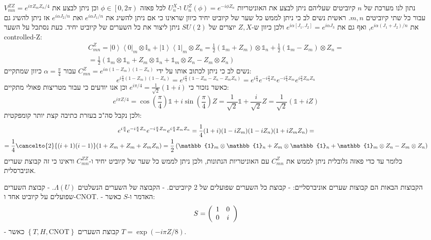 \documentclass{tstextbook}
\begin{document}
\begin{example}
נתון לנו מערכת של \(n\) קיוביטים שעליהם ניתן לבצע את האוניטריות \(U_{n}^{Z}\left( \phi \right)=e^{ -i\phi Z_{n} }\) ו-\(U_{n}^{X}\) לכל פאזה \(\phi \in \left[ 0,2\pi \right)\) וכן ניתן לבצע את \(V_{mn}^{Z Z}=e^{ i\pi Z_{m}Z_{n}/4 }\) עבור כל שתי קיוביטים \(m,n\). ראשית נשים לב כי ניתן לממש כל שער של קיוביט יחיד כיוון שראינו כי אם ניתן להשיג את \(e^{ i\alpha J_{1}/n  }\) ואת \(e^{ i\alpha J_{2}/n }\) אז ניתן להשיג גם את \(e^{ i\alpha(J_{1}+J_{2})/n }\), ואף גם את \(e^{ i\alpha [J_{1},J_{2}] }=e^{ i\alpha J_{3} }\) ולכן כיוון ש-\(Z,X\) יוצרים של \(SU(2)\) ניתן ליצור את כל השערים של קיוביט יחיד. כעת נסתכל על השער controlled-Z:
$$\begin{gather}C_{m n}^{Z}=\left|0\right\rangle\left\langle0\right|_{m}\otimes\mathbb{I}_{n}+\left|1\right\rangle\left\langle1\right|_{m}\otimes Z_{n}=\frac{1}{2}\left( \mathbb{1}_{m} +Z_{m} \right)\otimes \mathbb{1}_{n} +\frac{1}{2}\left( \mathbb{1}_{m} -Z_{m} \right)\otimes Z_{n} = \\=\frac{1}{2}\left( \mathbb{1}_{m} \otimes \mathbb{1} _{n} +Z_{m}\otimes \mathbb{1} _{n}+\mathbb{1} _{m}\otimes Z_{n}-Z_{m}\otimes Z_{n} \right)
\end{gather}$$
נשים לב כי ניתן לכתוב אותו על ידי \(C_{mn}^{Z}=e^{ i\alpha(1-Z_{m})(1-Z_{n}) }\) עבור \(\alpha=\frac{\pi}{4}\) כיוון שמתקיים:
$$e^{ i\frac{\pi}{4}(1-Z_{m})(1-Z_{n}) }=e^{ i\frac{\pi}{4} \left( \mathbb{1} -Z_{m} -Z_{n}-Z_{m}Z_{n}\right)}=e^{ i\frac{\pi}{4} }e^{ -i\frac{\pi}{4} Z_{n} }e^{ -i\frac{\pi}{4}Z_{m} }e^{ i\frac{\pi}{4} Z_{m}Z_{n} }$$
כאשר נזכור כי \(e^{ i\pi/4 }=\frac{1}{\sqrt{ 2 }}(1+i)\) וכן אנו יודעים כי עבור מטריצות פאולי מתקיים:
$$e^{ i\pi Z/4 }=\cos\left( \frac{\pi}{4} \right)\mathbb{1} +i\sin\left( \frac{\pi}{4} \right)Z=\frac{1}{\sqrt{ 2 }}\mathbb{1} +\frac{i}{\sqrt{ 2 }}Z=\frac{1}{\sqrt{ 2 }}\left( \mathbb{1} +iZ \right)$$
ולכן נקבל סה"כ בעזרת כתיבה קצת יותר קומפקטית:
$$\begin{gather}e^{ i\frac{\pi}{4} }e^{ -i\frac{\pi}{4} Z_{n} }e^{ -i\frac{\pi}{4}Z_{m} }e^{ i\frac{\pi}{4} Z_{m}Z_{n} }=\frac{1}{4}(1+i)(1-iZ_{m})(1-iZ_{n})(1+iZ_{m}Z_{n})=  \\=\frac{1}{4}\cancelto{ 2 }{ (i+1)(i-1) }(1+Z_{m}+Z_{m}+Z_{m}Z_{n})=\frac{1}{2}\left( \mathbb{1}_{m} \otimes \mathbb{1} _{n} +Z_{m}\otimes \mathbb{1} _{n}+\mathbb{1} _{m}\otimes Z_{n}-Z_{m}\otimes Z_{n} \right)
\end{gather}$$
כלומר עד כדי פאזה גלובלית ניתן לממש את \(C_{mn}^{Z}\) עם האוניטריות הנתונות, ולכן ניתן לממש כל שער של קיוביט יחיד ו-\(C_{mn}^{Z Z}\) וראינו כי זה קבוצת שערים אוניברסלית.

\end{example}
\begin{summary}
הקבוצות הבאות הם קבוצות שערים אוניברסליים:
- קבוצת כל השערים שפועלים של 2 קיוביטים.
- הקבוצה של השערים הנשלטים \(\Lambda(U)\).
- קבוצת השערים שפועלים על קיוביט אחד ו-CNOT.
- האדמר ו-\(S\) כאשר:
$$S=\left(\begin{array}{c c}{{1}}&{{0}}\\ {{0}}&{{i}}\end{array}\right)$$
- קבוצת השערים \(\left\{  T,H,\mathrm{CNOT}  \right\}\) כאשר \(T=\exp\left(-i\pi Z/8\right)\).

\end{summary}
\end{document}

